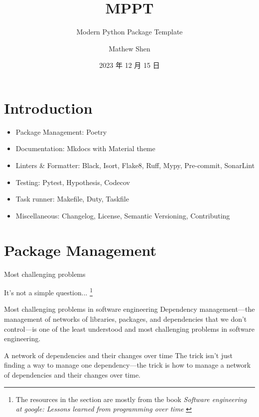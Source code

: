 \documentclass{ctexbeamer}
\title{MPPT}
\subtitle{Modern Python Package Template}
\author{Mathew Shen}
\date{2023 年 12 月 15 日}
\begin{document}
\begin{frame}
\titlepage
\end{frame}

\begin{frame}
    \tableofcontents
\end{frame}



\section{Introduction}
\begin{frame}

    \begin{itemize}
        \item Package Management: Poetry
        \item Documentation: Mkdocs with Material theme
        \item Linters \& Formatter: Black, Isort, Flake8, Ruff, Mypy, Pre-commit, SonarLint
        \item Testing: Pytest, Hypothesis, Codecov
        \item Task runner: Makefile, Duty, Taskfile
        \item Miscellaneous: Changelog, License, Semantic Versioning, Contributing
    \end{itemize}

\end{frame}


\section{Package Management}

\begin{frame}{Most challenging problems}

    It's not a simple question...
    \footnote{The resources in the section are mostly from the book
    \textit{Software engineering at google: Lessons learned from programming over time}
    \cite{google-sre}}
    

    \begin{alertblock}{Most challenging problems in software engineering}
        Dependency management—the management of networks of libraries, packages, and dependencies 
        that we don't control—is one of the least understood and most challenging problems 
        in software engineering.
    \end{alertblock}

    \pause

    \begin{exampleblock}{A network of dependencies and their changes over time}
        The trick isn't just finding a way to manage one dependency—the trick is 
        how to manage a network of dependencies and their changes over time.
    \end{exampleblock}

\end{frame}
\end{document}
